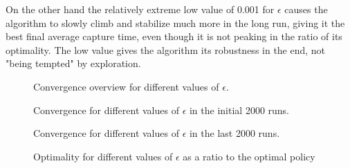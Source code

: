 \documentclass[paper=a4, fontsize=11pt]{scrartcl}
\numberwithin{equation}{section}		%
\numberwithin{figure}{section}			%
\numberwithin{table}{section}				%
\begin{document}
On the other hand the relatively extreme low value of 0.001 for $\epsilon$ causes the algorithm to slowly climb and stabilize much more in the long run, giving it the best final average capture time, even though it is not peaking in the ratio of its optimality. The low value gives the algorithm its robustness in the end, not "being tempted" by exploration.
\begin{figure}[H] \centering
\caption{Convergence overview for different values of $\epsilon$.} 
\label{figure:epsilonOverview}
\end{figure}
\begin{figure}[H] \centering
\caption{Convergence for different values of $\epsilon$ in the initial 2000 runs.} 
\label{figure:epsilonfirst20}
\end{figure}
\begin{figure}[H] \centering
\caption{Convergence for different values of $\epsilon$ in the last 2000 runs.} 
\label{figure:epsilonlast20}
\end{figure}
\begin{figure}[H] \centering
\caption{Optimality for different values of $\epsilon$ as a ratio to the optimal policy} 
\label{figure:epsilonOpti}
\end{figure}
\end{document}
